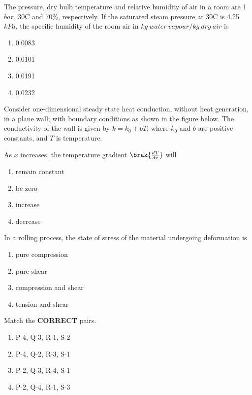 \item The pressure, dry bulb temperature and relative humidity of air in a room are 1 $bar$, 30\degree C and 70\%, respectively. If the saturated steam pressure at 30\degree C is 4.25 $kPa$, the specific humidity of the room air in $kg\ water\ vapour/kg\ dry\ air$ is 
 \begin{enumerate}
    \item 0.0083
    \item 0.0101 
    \item 0.0191 
    \item 0.0232 \\
 \end{enumerate}
\item Consider one-dimensional steady state heat conduction, without heat generation, in a plane wall; with boundary conditions as shown in the figure below. The conductivity of the wall is given by $k = k_0 + bT$; where $k_0$ and $b$ are positive constants, and $T$ is temperature. 
\begin{figure}[!ht]
\centering
\resizebox{0.4\textwidth}{!}{%

}%
\end{figure}
As $x$ increases, the temperature gradient $\brak{\frac{dT}{dx}}$ will
\begin{enumerate}
     \item remain constant
     \item be zero
     \item increase
     \item decrease \\
 \end{enumerate}
\item In a rolling process, the state of stress of the material undergoing deformation is 
\begin{enumerate}
    \item pure compression
    \item pure shear
    \item compression and shear 
    \item tension and shear  \\
\end{enumerate}
\item Match the \textbf{CORRECT} pairs.
\begin{table}[h!]
  \centering
  
\end{table}
\begin{enumerate}
    \item P-4, Q-3, R-1, S-2
    \item P-4, Q-2, R-3, S-1
    \item P-2, Q-3, R-4, S-1 
    \item P-2, Q-4, R-1, S-3 \\
\end{enumerate}
